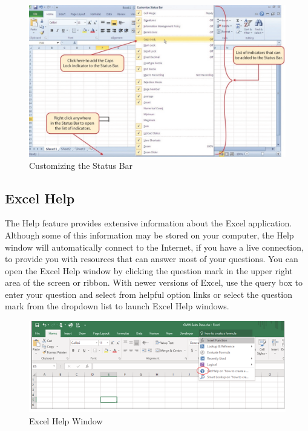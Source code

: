 \begin{figure}[H]
	\centering
	\includegraphics[width=\maxwidth{.95\linewidth}]{gfx/Ch01_fig13}
	\caption{Customizing the Status Bar}
	\label{01:fig13}
\end{figure}

\subsection{Excel Help}

The Help feature provides extensive information about the Excel application. Although some of this information may be stored on your computer, the Help window will automatically connect to the Internet, if you have a live connection, to provide you with resources that can answer most of your questions. You can open the Excel Help window by clicking the question mark in the upper right area of the screen or ribbon. With newer versions of Excel, use the query box to enter your question and select from helpful option links or select the question mark from the dropdown list to launch Excel Help windows.

\begin{figure}[H]
	\centering
	\includegraphics[width=\maxwidth{.95\linewidth}]{gfx/Ch01_fig14}
	\caption{Excel Help Window}
	\label{01:fig14}
\end{figure}

